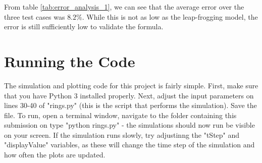 \documentclass[10pt]{article}
\begin{document}
From table \ref{tab:error_analysis_1}, we can see that the average error over the three test cases was $\mathbf{8.2\%}$. While this is not as low as the leap-frogging model, the error is still sufficiently low to validate the formula.

\section{Running the Code}

The simulation and plotting code for this project is fairly simple. First, make sure that you have Python 3 installed properly. Next, adjust the input parameters on lines 30-40 of "rings.py" (this is the script that performs the simulation). Save the file. To run, open a terminal window, navigate to the folder containing this submission on type "python rings.py" - the simulations should now run be visible on your screen. If the simulation runs slowly, try adjustinng the "tStep" and "displayValue" variables, as these will change the time step of the simulation and how often the plots are updated.
\end{document}
